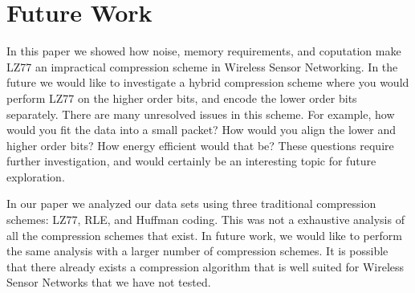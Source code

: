 \section{Future Work}
\label{sec-future}

In this paper we showed how noise, memory requirements, and coputation
make LZ77 an impractical compression scheme in Wireless Sensor
Networking. In the future we would like to investigate a hybrid
compression scheme where you would perform LZ77 on the higher order
bits, and encode the lower order bits separately. There are many
unresolved issues in this scheme. For example, how would you fit the
data into a small packet? How would you align the lower and higher
order bits? How energy efficient would that be?  These questions
require further investigation, and would certainly be an interesting
topic for future exploration.

In our paper we analyzed our data sets using three traditional
compression schemes: LZ77, RLE, and Huffman coding. This was not a
exhaustive analysis of all the compression schemes that exist. In
future work, we would like to perform the same analysis with a larger
number of compression schemes. It is possible that there already
exists a compression algorithm that is well suited for Wireless Sensor
Networks that we have not tested. 

 
